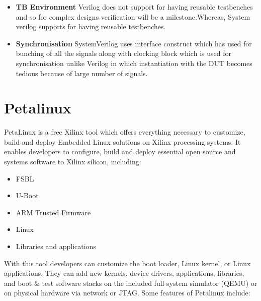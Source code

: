 \begin{itemize}
	\item \textbf{TB Environment} Verilog does not support for having reusable testbenches and so for complex designs verification will be a milestone.Whereas, System verilog supports for having reusable testbenches.
	
	\item \textbf{Synchronisation} SystemVerilog uses interface construct which has used for bunching of all the signals along with clocking block which is used for synchronisation unlike Verilog in which instantiation with the DUT becomes tedious because of large number of signals.
	
\end{itemize}
\pagebreak



\section{Petalinux}
PetaLinux is a free Xilinx tool which offers everything necessary to customize, build and deploy Embedded Linux solutions on Xilinx processing systems. It enables developers to configure, build and deploy essential open source and systems software to Xilinx silicon, including: 
\begin{itemize}
  \item FSBL
  \item U-Boot
  \item ARM Trusted Firmware
  \item Linux
  \item Libraries and applications
\end{itemize}

With this tool developers can customize the boot loader, Linux kernel, or Linux applications. They can add new kernels, device drivers, applications, libraries, and boot \& test software stacks on the included full system simulator (QEMU) or on physical hardware via network or JTAG. Some features of Petalinux include:

